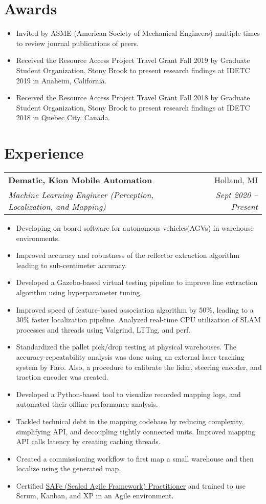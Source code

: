 \documentclass[letterpaper,10pt]{article}
\makeatletter
\newcommand{\resumeHeading}[4]{
  \vspace{-1pt}
    \begin{tabular*}{0.97\textwidth}{l@{\extracolsep{\fill}}r}
      \textbf{#1} & #2 \vspace{-2pt}\\ \vspace{1pt}
      \textit{\small#3} & \textit{\small #4} \\
    \end{tabular*}
}
\newcommand{\resumeSection}[1]{
\vspace{-12pt}
\section{\textbf{#1}}
}
\newcommand{\resumeItemListStart}{
\vspace{-7pt}
\begin{itemize}[leftmargin=14pt]
}
\newcommand{\resumeItemListEnd}{
\vspace{+7pt}
\end{itemize}
}
\newcommand{\resumeItem}[1]{
  \item\small{
      {#1 \vspace{-7pt}
      }
  }
}
\makeatother
\begin{document}
\resumeSection{Awards}
\vspace{+7pt}

\resumeItemListStart
\resumeItem{Invited by ASME (American Society of Mechanical Engineers) multiple times to review journal publications of peers.}
\resumeItem{Received the Resource Access Project Travel Grant Fall 2019 by Graduate Student Organization, Stony Brook to present research findings at IDETC 2019 in Anaheim, California.}
\resumeItem{Received the Resource Access Project Travel Grant Fall 2018 by Graduate Student Organization, Stony Brook to present research findings at IDETC 2018 in Quebec City, Canada.}
\resumeItemListEnd



\resumeSection{Experience}

\resumeHeading
{Dematic, Kion Mobile Automation}{Holland, MI}
{Machine Learning Engineer (Perception, Localization, and Mapping)}{Sept 2020 -- Present}
\resumeItemListStart
\resumeItem{Developing  on-board software for autonomous vehicles(AGVs) in warehouse environments.}
\resumeItem{Improved accuracy and robustness of the reflector extraction algorithm leading to sub-centimeter accuracy.}
\resumeItem{Developed a Gazebo-based virtual testing pipeline to improve line extraction algorithm using hyperparameter tuning.}
\resumeItem{Improved speed of feature-based association algorithm by 50\%, leading to a 30\% faster localization pipeline. Analyzed real-time CPU utilization of SLAM processes and threads using Valgrind, LTTng, and perf.}
\resumeItem{Standardized the pallet pick/drop testing at physical warehouses. The accuracy-repeatability analysis was done using an external laser tracking system by Faro. Also, a procedure to calibrate the lidar, steering encoder, and traction encoder was created.}
\resumeItem{Developed a Python-based tool to visualize recorded mapping logs, and automated their offline performance analysis.}
\resumeItem{Tackled technical debt in the mapping codebase by reducing complexity, simplifying API, and decoupling tightly connected units. Improved mapping API calls latency by creating caching threads.}
\resumeItem{Created a commissioning workflow to first map a small warehouse and then localize using the generated map.}
\resumeItem{Certified \href{https://www.youracclaim.com/go/eCNozIcD}{SAFe (Scaled Agile Framework) Practitioner} and trained to use Scrum, Kanban, and XP in an Agile environment.}
\resumeItemListEnd
\end{document}
